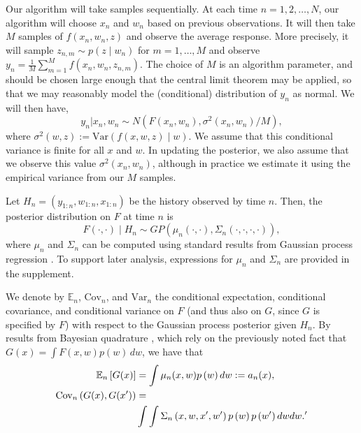 \documentclass{article}
\newcommand{\w}{w}
\newcommand{\z}{z}
\begin{document}
Our algorithm will take samples sequentially. 
At each time $n=1,2,\ldots,N$, our algorithm will choose 
$x_{n}$ and $\w_{n}$ based on previous observations.
It will then take $M$ samples of $f\left(x_n,\w_n,\z\right)$ and observe the average response.
More precisely, it will sample $\z_{n,m}\sim p\left(\z\mid \w_{n}\right)$
for $m=1,\ldots,M$ and observe $y_{n}=\frac{1}{M}\sum_{m=1}^{M}f\left(x_{n},\w_{n},\z_{n,m}\right)$. 
The choice of $M$ is an algorithm parameter, and should be chosen large enough
that the central limit theorem may be applied, so that we may
reasonably model the (conditional) distribution of $y_n$ as normal.  We will then have,
\begin{equation*}
y_{n} | x_n, \w_n  \sim N\left( F\left(x_{n},\w_{n}\right), \sigma^{2}\left(x_{n},\w_{n}\right)/M \right),
\end{equation*}
where $\sigma^{2}\left(\w,\z\right):=\mbox{Var}\left(f\left(x,\w,\z\right)\mid \w\right)$.
We assume that this conditional variance is finite for all $x$ and $\w$.
In updating the posterior, we also assume that we observe this value $\sigma^{2}\left(x_{n},\w_{n}\right)$, although in practice we estimate it using the empirical variance from our $M$ samples.


Let $H_{n} = \left( y_{1:n},\w_{1:n},x_{1:n}\right)$ be the history observed by time $n$.
Then, the posterior distribution on $F$ at time $n$ is
\[
F\left(\cdot,\cdot\right)\mid H_{n}\sim GP\left(\mu_{n}\left(\cdot,\cdot\right),\Sigma_{n}\left(\cdot,\cdot,\cdot,\cdot\right)\right),
\]
where $\mu_{n}$ and $\Sigma_{n}$ can be computed using standard
results from Gaussian process regression \cite{RaWi06}.
To support later analysis, expressions for $\mu_n$ and $\Sigma_n$ are provided in the supplement.


We denote by $\mathbb{E}_{n}$, $\mathrm{Cov}_{n}$, and $\mathrm{Var}_n$ the conditional expectation, conditional covariance, and conditional variance
on $F$ (and thus also on $G$, since $G$ is specified by $F$) with respect to the Gaussian process posterior given $H_n$.
By results from Bayesian quadrature \cite{o1991bayes}, which rely on the
previously noted fact that $G(x) = \int F(x,\w) p(\w)\,d\w$,
we have that
\begin{align}
\mathbb{E}_{n}\left[G(x) \right] 
&= \int\mu_{n}(x,w)p\left(w\right)d\w := a_n(x), \label{eq:a_n} \\
\mbox{Cov}_{n}\left(G(x),G(x')\right)
& = \notag\\
&\int\int\Sigma_{n}\left(x,\w,x',\w'\right)p\left(\w\right)p\left(\w'\right)d\w d\w.'
\end{align}
\end{document}
